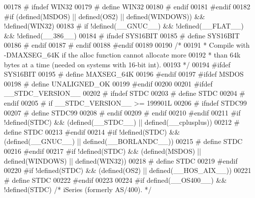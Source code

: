 \begin{DoxyCode}
00178 \textcolor{preprocessor}{#  ifndef WIN32}
00179 \textcolor{preprocessor}{#    define WIN32}
00180 \textcolor{preprocessor}{#  endif}
00181 \textcolor{preprocessor}{#endif}
00182 \textcolor{preprocessor}{#if (defined(MSDOS) || defined(OS2) || defined(WINDOWS)) && !defined(WIN32)}
00183 \textcolor{preprocessor}{#  if !defined(\_\_GNUC\_\_) && !defined(\_\_FLAT\_\_) && !defined(\_\_386\_\_)}
00184 \textcolor{preprocessor}{#    ifndef SYS16BIT}
00185 \textcolor{preprocessor}{#      define SYS16BIT}
00186 \textcolor{preprocessor}{#    endif}
00187 \textcolor{preprocessor}{#  endif}
00188 \textcolor{preprocessor}{#endif}
00189 
00190 \textcolor{comment}{/*}
00191 \textcolor{comment}{ * Compile with -DMAXSEG\_64K if the alloc function cannot allocate more}
00192 \textcolor{comment}{ * than 64k bytes at a time (needed on systems with 16-bit int).}
00193 \textcolor{comment}{ */}
00194 \textcolor{preprocessor}{#ifdef SYS16BIT}
00195 \textcolor{preprocessor}{#  define MAXSEG\_64K}
00196 \textcolor{preprocessor}{#endif}
00197 \textcolor{preprocessor}{#ifdef MSDOS}
00198 \textcolor{preprocessor}{#  define UNALIGNED\_OK}
00199 \textcolor{preprocessor}{#endif}
00200 
00201 \textcolor{preprocessor}{#ifdef \_\_STDC\_VERSION\_\_}
00202 \textcolor{preprocessor}{#  ifndef STDC}
00203 \textcolor{preprocessor}{#    define STDC}
00204 \textcolor{preprocessor}{#  endif}
00205 \textcolor{preprocessor}{#  if \_\_STDC\_VERSION\_\_ >= 199901L}
00206 \textcolor{preprocessor}{#    ifndef STDC99}
00207 \textcolor{preprocessor}{#      define STDC99}
00208 \textcolor{preprocessor}{#    endif}
00209 \textcolor{preprocessor}{#  endif}
00210 \textcolor{preprocessor}{#endif}
00211 \textcolor{preprocessor}{#if !defined(STDC) && (defined(\_\_STDC\_\_) || defined(\_\_cplusplus))}
00212 \textcolor{preprocessor}{#  define STDC}
00213 \textcolor{preprocessor}{#endif}
00214 \textcolor{preprocessor}{#if !defined(STDC) && (defined(\_\_GNUC\_\_) || defined(\_\_BORLANDC\_\_))}
00215 \textcolor{preprocessor}{#  define STDC}
00216 \textcolor{preprocessor}{#endif}
00217 \textcolor{preprocessor}{#if !defined(STDC) && (defined(MSDOS) || defined(WINDOWS) || defined(WIN32))}
00218 \textcolor{preprocessor}{#  define STDC}
00219 \textcolor{preprocessor}{#endif}
00220 \textcolor{preprocessor}{#if !defined(STDC) && (defined(OS2) || defined(\_\_HOS\_AIX\_\_))}
00221 \textcolor{preprocessor}{#  define STDC}
00222 \textcolor{preprocessor}{#endif}
00223 
00224 \textcolor{preprocessor}{#if defined(\_\_OS400\_\_) && !defined(STDC)    }\textcolor{comment}{/* iSeries (formerly AS/400). */}\textcolor{preprocessor}{}

\end{DoxyCode}
